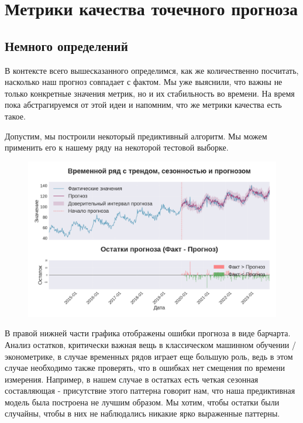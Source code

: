 \section{Метрики качества точечного прогноза}
\label{sec:metrics}

\subsection{Немного определений}

В контексте всего вышесказанного определимся, как же количественно
посчитать, насколько наш прогноз совпадает с фактом. Мы уже выяснили,
что важны не только конкретные значения метрик, но и их стабильность
во времени. На время пока абстрагируемся от этой идеи и напомним, что
же метрики качества есть такое.

Допустим, мы построили некоторый предиктивный алгоритм. Мы можем
применить его к нашему ряду на некоторой тестовой выборке.

\begin{figure}[htb]
  \centering
  \includegraphics[width=1\textwidth]{images/forecast_errors.png}
\end{figure}

В правой нижней части графика отображены ошибки прогноза в виде барчарта.
Анализ остатков, критически важная вещь в классическом машинном
обучении / эконометрике, в случае временных рядов играет еще большую
роль, ведь в этом случае необходимо также проверять, что в ошибках
нет смещения по времени измерения. Например, в нашем случае в
остатках есть четкая сезонная составляющая - присутствие этого
паттерна говорит нам, что наша предиктивная модель была построена не
лучшим образом. Мы хотим, чтобы остатки были случайны, чтобы в них не
наблюдались никакие ярко выраженные паттерны.

